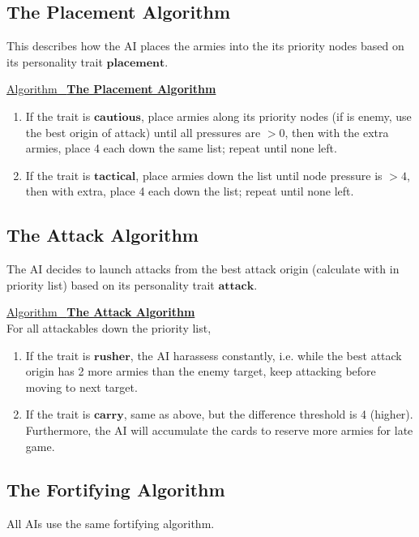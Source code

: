 \documentclass[12pt]{article}  %
\newcommand{\algtitle}[1]{\underline{Algorithm \ {\bf #1}} \vspace*{1mm}\\}
\begin{document}
\subsection{The Placement Algorithm}
This describes how the AI places the armies into the its priority nodes based on its personality trait $\textbf{placement}$.

\algtitle{The Placement Algorithm}
\begin{enumerate}
	\item If the trait is $\textbf{cautious}$, place armies along its  priority nodes (if is enemy, use the best origin of attack) until all pressures are $>0$, then with the extra armies, place 4 each down the same list; repeat until none left.
	\item If the trait is $\textbf{tactical}$, place armies down the list until node pressure is $>4$, then with extra, place 4 each down the list; repeat until none left.
\end{enumerate}







\subsection{The Attack Algorithm}
The AI decides to launch attacks from the best attack origin (calculate with in priority list) based on its personality trait $\textbf{attack}$.

\algtitle{The Attack Algorithm}
For all attackables down the priority list,
\begin{enumerate}
	\item If the trait is $\textbf{rusher}$, the AI harassess constantly, i.e. while the best attack origin has 2 more armies than the enemy target, keep attacking before moving to next target.
	\item If the trait is $\textbf{carry}$, same as above, but the difference threshold is 4 (higher). Furthermore, the AI will accumulate the cards to reserve more armies for late game.
\end{enumerate}








\subsection{The Fortifying Algorithm}
All AIs use the same fortifying algorithm.
\end{document}
